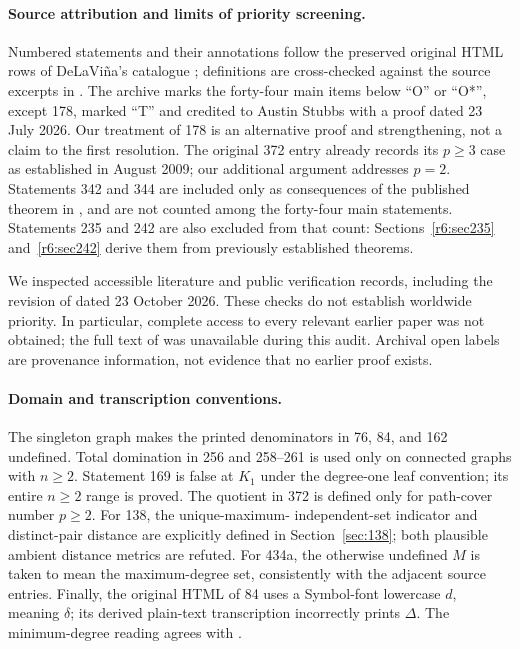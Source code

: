 \documentclass[11pt,a4paper]{article}
\theoremstyle{remark}
\begin{document}
\paragraph{Source attribution and limits of priority screening.}
Numbered statements and their annotations follow the preserved original
HTML rows of DeLaVi\~na's catalogue \cite{WOWII,Archive}; definitions are
cross-checked against the source excerpts in \cite{Glossary}.
The archive marks the forty-four main items below ``O'' or ``O*'', except 178, marked
``T'' and credited to Austin Stubbs with a proof dated 23 July 2026.
Our treatment of 178 is an alternative proof and strengthening, not a
claim to the first resolution. The original 372 entry already records its
$p\ge3$ case as established in August 2009; our additional argument addresses
$p=2$. Statements 342 and 344 are included only as consequences of the
published theorem in \cite{DLPW10}, and are not counted among the forty-four
main statements. Statements 235 and 242 are also excluded from that count:
Sections~\ref{r6:sec235} and~\ref{r6:sec242} derive them from previously
established theorems.

We inspected accessible literature and public verification records,
including the revision of \cite{Audit} dated 23 October 2026.
These checks do not establish worldwide priority. In particular, complete
access to every relevant earlier paper was not obtained; the full text
of \cite{Jiang16} was unavailable during this audit. Archival open labels
are provenance information, not evidence that no earlier proof exists.

\paragraph{Domain and transcription conventions.}
The singleton graph makes the printed denominators in 76, 84, and 162
undefined. Total domination in 256 and 258--261 is used only on connected
graphs with $n\ge2$. Statement 169 is false at $K_1$ under the degree-one
leaf convention; its entire $n\ge2$ range is proved. The quotient in 372
is defined only for path-cover number $p\ge2$. For 138, the unique-maximum-
independent-set indicator and distinct-pair distance are explicitly defined
in Section~\ref{sec:138}; both plausible ambient distance metrics are refuted.
For 434a, the otherwise undefined $M$ is taken to mean the maximum-degree
set, consistently with the adjacent source entries. Finally, the original
HTML of 84 uses a Symbol-font lowercase $d$, meaning $\delta$; its derived
plain-text transcription incorrectly prints $\Delta$. The minimum-degree
reading agrees with \cite{West,FC}.
\end{document}
